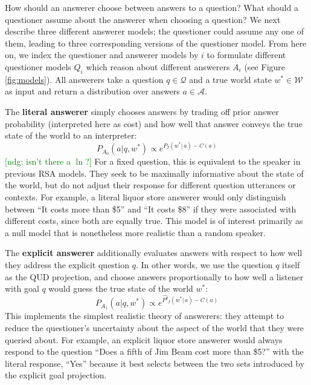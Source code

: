 \documentclass[12pt, floatsintext, jou]{apa6}
\newcommand{\ndg}[1]{\textcolor{Green}{[ndg: #1]}}
\begin{document}
How should an answerer choose between answers to a question? What should a questioner assume about the answerer when choosing a question? We next describe three different answerer models; the questioner could assume any one of them, leading to three corresponding versions of the questioner model. From here on, we index the questioner and answerer models by $i$ to formulate different questioner models $Q_i$ which reason about different answerers $A_i$ (see Figure \ref{fig:models}).
All answerers take a question $q \in \mathcal{Q}$ and a true world state $w^* \in \mathcal{W}$ as input and return a distribution over answers $a \in \mathcal{A}$.
%

The \textbf{literal answerer} simply chooses answers by trading off prior answer probability (interpreted here as cost) and how well that answer conveys the true state of the world to an interpreter:
%
$$P_{A_0}(a | q,w^*) \propto e^{P_I(w^* | \,a) - C(a)} $$
\ndg{isn't there a $\ln$?}
%
For a fixed question, this is equivalent to the speaker in previous RSA models. They seek to be maximally informative about the state of the world, but do not adjust their response for different question utterances or contexts. For example, a literal liquor store answerer would only distinguish between ``It costs more than \$5'' and ``It costs \$8'' if they were associated with different costs, since both are equally true. This model is of interest primarily as a null model that is nonetheless more realistic than a random speaker. 
%

The \textbf{explicit answerer} additionally evaluates answers with respect to how well they address the explicit question $q$. In other words, we use the question $q$ itself as the QUD projection, and choose answers proportionally to how well a listener with goal $q$ would guess the true state of the world $w^*$:
%
$$P_{A_1}(a | q, w^*) \propto e^{\widehat{P^q}_I(w^* | \, a) - C(a)}$$
This implements the simplest realistic theory of answerers: they attempt to reduce the questioner's uncertainty about the aspect of the world that they were queried about. For example, an explicit liquor store answerer would always respond to the question ``Does a fifth of Jim Beam cost more than \$5?'' with the literal response, ``Yes'' because it best selects between the two sets introduced by the explicit goal projection. 
\end{document}
